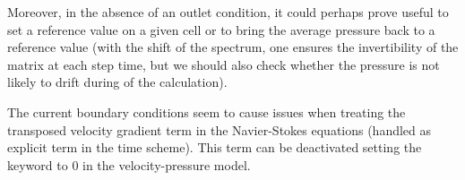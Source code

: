 Moreover, in the absence of an outlet condition, it could perhaps
prove useful to set a reference value on a given cell
or to bring the average pressure back to a reference value (with the
shift of the spectrum, one ensures the invertibility of the matrix at each step
time, but we should also check whether the pressure is not likely to drift during
of the calculation).

The current boundary conditions seem to cause issues when treating the transposed
velocity gradient term in the Navier-Stokes equations (handled as explicit term in the
time scheme). This term can be deactivated setting the  keyword to $0$
in the velocity-pressure model.
